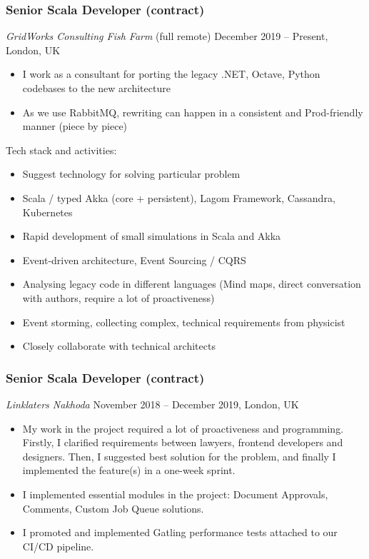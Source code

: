 \documentclass[]{rss}
\providecommand{\tightlist}{%
  \setlength{\itemsep}{0pt}\setlength{\parskip}{0pt}}
\begin{document}
\begin{resume}
\subsubsection{Senior Scala Developer
(contract)}\label{senior-scala-developer-contract}

\emph{GridWorks Consulting \textbar{} Fish Farm} (full remote) December
2019 -- Present, London, UK

\begin{itemize}
\item
  I work as a consultant for porting the legacy .NET, Octave, Python
  codebases to the new architecture
\item
  As we use RabbitMQ, rewriting can happen in a consistent and
  Prod-friendly manner (piece by piece)
\end{itemize}

Tech stack and activities:

\begin{itemize}
\tightlist
\item
  Suggest technology for solving particular problem
\item
  Scala / typed Akka (core + persistent), Lagom Framework, Cassandra,
  Kubernetes
\item
  Rapid development of small simulations in Scala and Akka
\item
  Event-driven architecture, Event Sourcing / CQRS
\item
  Analysing legacy code in different languages (Mind maps, direct
  conversation with authors, require a lot of proactiveness)
\item
  Event storming, collecting complex, technical requirements from
  physicist
\item
  Closely collaborate with technical architects
\end{itemize}

\subsubsection{Senior Scala Developer
(contract)}\label{senior-scala-developer-contract-1}

\emph{Linklaters \textbar{} Nakhoda} November 2018 -- December 2019,
London, UK

\begin{itemize}
\item
  My work in the project required a lot of proactiveness and
  programming. Firstly, I clarified requirements between lawyers,
  frontend developers and designers. Then, I suggested best solution for
  the problem, and finally I implemented the feature(s) in a one-week
  sprint.
\item
  I implemented essential modules in the project: Document Approvals,
  Comments, Custom Job Queue solutions.
\item
  I promoted and implemented Gatling performance tests attached to our
  CI/CD pipeline.
\end{itemize}


\end{resume}
\end{document}
